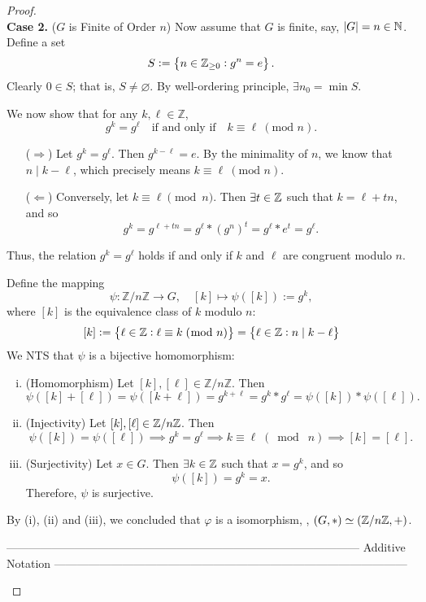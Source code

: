 \documentclass[11pt,openany]{article}
\begin{document}
\begin{proof}
	\ \\
	\noindent
	\textbf{Case 2.}\; (\(G\) is Finite of Order \(n\))\; Now assume that \(G\) is finite, say, \(|G|=n\in\mathbb{N}\). Define a set \[
	S:=\set{n\in\mathbb{Z}_{\geq 0}: g^n=e}.
	\] Clearly $0\in S$; that is, $S\neq\varnothing$. By well-ordering principle, $\exists n_0=\min S$.\\
	\begin{tcolorbox}
	We now show that for any \(k,\ell\in \mathbb{Z}\), \[
	g^k = g^\ell \quad \text{if and only if} \quad k\equiv \ell \ (\text{mod } n).
	\] \begin{itemize}
		\item[($\Rightarrow$)] Let \(g^k = g^\ell\). Then $g^{k-\ell}=e$.
		By the minimality of \(n\), we know that $n\mid k-\ell$, which precisely means \(k\equiv \ell \ (\text{mod } n)\).
		\item[($\Leftarrow$)] Conversely, let \(k\equiv \ell \pmod{n}\). Then $\exists t\in\mathbb{Z}$ such that $k = \ell + tn$, and so \[
		g^k = g^{\ell + tn} = g^\ell \ast (g^n)^t = g^\ell \ast e^t = g^\ell.
		\] 
	\end{itemize} Thus, the relation \(g^k = g^\ell\) holds if and only if \(k\) and \(\ell\) are congruent modulo \(n\).
	\end{tcolorbox}\noindent
	Define the mapping\[
	\psi: \mathbb{Z}/n\mathbb{Z} \to G,\quad [k]\mapsto \psi([k]):=g^k,
	\] where \([k]\) is the equivalence class of \(k\) modulo \(n\): \[
	[k]:=\set{\ell\in\mathbb{Z}:\ell\equiv k\; (\bmod\; {n}) }=\set{\ell\in\mathbb{Z}:n\mid k-\ell }
	\] We NTS that \(\psi\) is a bijective homomorphism:
	\begin{enumerate}[(i)]
		\item (Homomorphism)\; Let \([k],[\ell]\in \mathbb{Z}/n\mathbb{Z}\). Then
		\[
		\psi([k]+[\ell]) = \psi([k+\ell]) = g^{k+\ell} = g^k \ast g^\ell = \psi([k]) \ast \psi([\ell]).
		\]
		\item (Injectivity)\; Let $[k],[\ell]\in\mathbb{Z}/n\mathbb{Z}$. Then \[
		\psi([k])=\psi([\ell])\implies g^k=g^\ell\implies k\equiv\ell\; (\bmod\; {n})\implies [k]=[\ell].
		\]
		\item (Surjectivity)\; Let \(x\in G\). Then $\exists k\in \mathbb{Z}$ such that \(x=g^k\), and so \[
		\psi([k])=g^k = x.
		\] Therefore, \(\psi\) is surjective.
	\end{enumerate}
	By (i), (ii) and (iii), we concluded that \(\varphi\) is a isomorphism, \ie, $(G,\ast) \simeq (\mathbb{Z}/n\mathbb{Z},+)$.
\begin{center}
	\ttfamily --------------------------------------------------------------------------------------------- Additive Notation ---------------------------------------------------------------------------------------------

\end{center}
\end{proof}
\end{document}

